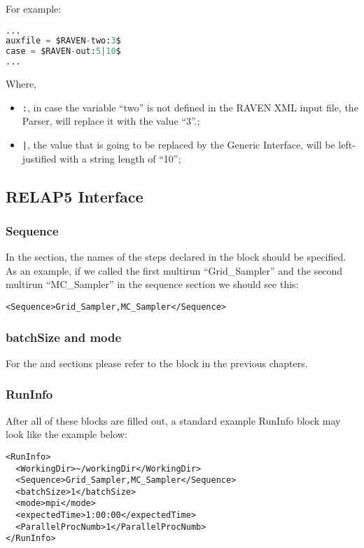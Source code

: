 For example:
\begin{lstlisting}[language=python]
...
auxfile = $RAVEN-two:3$
case = $RAVEN-out:5|10$
...
\end{lstlisting}
Where,
\begin{itemize}
  \item  \texttt{:}, in case the variable ``two'' is not defined in the RAVEN XML input file, the Parser, will replace it with the value ``3''.;
  \item  \texttt{|}, the value that is going to be replaced by the Generic Interface, will be left- justified with a string length of ``10'';
\end{itemize}

\subsection{RELAP5 Interface}
\label{subsec:RELAP5Interface}

\subsubsection{Sequence}
In the  section, the names of the steps declared in the
 block should be specified.
%
As an example, if we called the first multirun ``Grid\_Sampler'' and the second
multirun ``MC\_Sampler'' in the sequence section we should see this:
\begin{lstlisting}[style=XML]
<Sequence>Grid_Sampler,MC_Sampler</Sequence>
\end{lstlisting}

\subsubsection{batchSize and mode}
For the  and  sections please refer to the
 block in the previous chapters.
%
\subsubsection{RunInfo}
After all of these blocks are filled out, a standard example RunInfo block may
look like the example below:
\begin{lstlisting}[style=XML]
<RunInfo>
  <WorkingDir>~/workingDir</WorkingDir>
  <Sequence>Grid_Sampler,MC_Sampler</Sequence>
  <batchSize>1</batchSize>
  <mode>mpi</mode>
  <expectedTime>1:00:00</expectedTime>
  <ParallelProcNumb>1</ParallelProcNumb>
</RunInfo>
\end{lstlisting}
